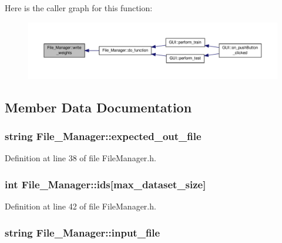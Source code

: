 Here is the caller graph for this function\-:\nopagebreak
\begin{figure}[H]
\begin{center}
\leavevmode
\includegraphics[width=350pt]{d8/d84/a00001_a67e37c5e1429df91a8c4ff836579cdc0_icgraph}
\end{center}
\end{figure}




\subsection{Member Data Documentation}
\hypertarget{a00001_a8b8f5c9cc3ffcb083ccc4fce1c05ca44}{
\subsubsection[{expected\-\_\-out\-\_\-file}]{\setlength{\rightskip}{0pt plus 5cm}string File\-\_\-\-Manager\-::expected\-\_\-out\-\_\-file\hspace{0.3cm}{\ttfamily [private]}}}\label{d8/d84/a00001_a8b8f5c9cc3ffcb083ccc4fce1c05ca44}


Definition at line 38 of file File\-Manager.\-h.

\hypertarget{a00001_aa298881ac48abd6b81764741be6485f7}{
\subsubsection[{ids}]{\setlength{\rightskip}{0pt plus 5cm}int File\-\_\-\-Manager\-::ids\mbox{[}{\bf max\-\_\-dataset\-\_\-size}\mbox{]}\hspace{0.3cm}{\ttfamily [private]}}}\label{d8/d84/a00001_aa298881ac48abd6b81764741be6485f7}


Definition at line 42 of file File\-Manager.\-h.

\hypertarget{a00001_a78b144182e3cfc70f9aae78ebdd66e51}{
\subsubsection[{input\-\_\-file}]{\setlength{\rightskip}{0pt plus 5cm}string File\-\_\-\-Manager\-::input\-\_\-file\hspace{0.3cm}{\ttfamily [private]}}}\label{d8/d84/a00001_a78b144182e3cfc70f9aae78ebdd66e51}


